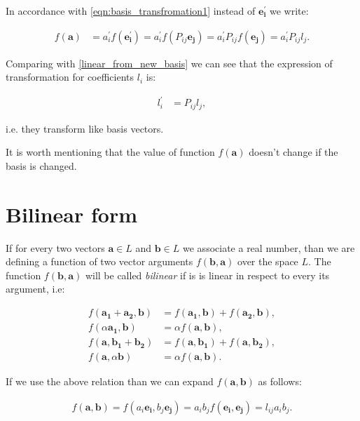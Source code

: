 \documentclass{book}
\begin{document}
In accordance with \eqref{eqn:basis_transfromation1} instead of $\boldsymbol{e^{'}_i}$ we write:

\begin{align*}
f(\boldsymbol{a}) &= a^{'}_if(\boldsymbol{e^{'}_i}) = a^{'}_if(P_{ij}\boldsymbol{e_j}) =  a^{'}_iP_{ij}f(\boldsymbol{e_j}) = a^{'}_iP_{ij}l_j.\label{linear_from0}
\end{align*}

Comparing with \eqref{linear_from_new_basis} we can see that the expression of transformation for coefficients $l_i$ is:

\begin{align}
l_i^{'}&= P_{ij}l_j,\label{covariant_transformation}
\end{align}

i.e. they transform like basis vectors.

It is worth mentioning that the value of function $f(\boldsymbol{a})$ doesn't change if the basis is changed.

\section{Bilinear form}

If for every two vectors $\boldsymbol{a} \in L$ and $\boldsymbol{b} \in L$ we associate a real number, than we are defining a function of two vector arguments $f(\boldsymbol{b}, \boldsymbol{a})$ over the space $L$. The function $f(\boldsymbol{b}, \boldsymbol{a})$ will be called \emph{bilinear} if is is linear in respect to every its argument, i.e:

\begin{align*}
f(\boldsymbol{a_1} + \boldsymbol{a_2}, \boldsymbol{b}) &= f(\boldsymbol{a_1}, \boldsymbol{b}) + f(\boldsymbol{a_2}, \boldsymbol{b}), \\
f(\alpha\boldsymbol{a_1}, \boldsymbol{b}) &= \alpha f(\boldsymbol{a}, \boldsymbol{b}), \\
f(\boldsymbol{a}, \boldsymbol{b_1} + \boldsymbol{b_2}) &= f(\boldsymbol{a}, \boldsymbol{b_1}) + f(\boldsymbol{a}, \boldsymbol{b_2}), \\
f(\boldsymbol{a}, \alpha\boldsymbol{b}) &= \alpha f(\boldsymbol{a}, \boldsymbol{b}).
\end{align*}

If we use the above relation than we can expand $f(\boldsymbol{a}, \boldsymbol{b})$ as follows:

\begin{align*}
f(\boldsymbol{a}, \boldsymbol{b}) = f (a_i\boldsymbol{e_i}, b_j\boldsymbol{e_j}) = a_{i}b_{j}f(\boldsymbol{e_i}, \boldsymbol{e_j}) = l_{ij}a_{i}b_{j} .
\end{align*}
\end{document}
